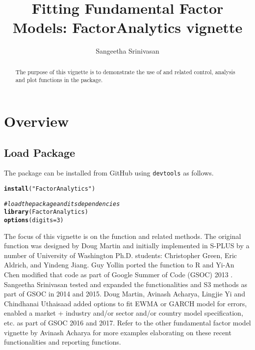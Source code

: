 \documentclass[a4paper]{article}\usepackage[]{graphicx}\usepackage[]{color}
\makeatletter
\newcommand{\hlnum}[1]{\textcolor[rgb]{0.686,0.059,0.569}{#1}}%
\newcommand{\hlstr}[1]{\textcolor[rgb]{0.192,0.494,0.8}{#1}}%
\newcommand{\hlcom}[1]{\textcolor[rgb]{0.678,0.584,0.686}{\textit{#1}}}%
\newcommand{\hlstd}[1]{\textcolor[rgb]{0.345,0.345,0.345}{#1}}%
\newcommand{\hlkwc}[1]{\textcolor[rgb]{0.333,0.667,0.333}{#1}}%
\newcommand{\hlkwd}[1]{\textcolor[rgb]{0.737,0.353,0.396}{\textbf{#1}}}%
\newenvironment{kframe}{%
 \def\at@end@of@kframe{}%
 \ifinner\ifhmode%
  \def\at@end@of@kframe{\end{minipage}}%
  \begin{minipage}{\columnwidth}%
 \fi\fi%
 \def\FrameCommand##1{\hskip\@totalleftmargin \hskip-\fboxsep
 \colorbox{shadecolor}{##1}\hskip-\fboxsep
     \hskip-\linewidth \hskip-\@totalleftmargin \hskip\columnwidth}%
 \MakeFramed {\advance\hsize-\width
   \@totalleftmargin\z@ \linewidth\hsize
   \@setminipage}}%
 {\par\unskip\endMakeFramed%
 \at@end@of@kframe}
\newenvironment{knitrout}{}{} %
\makeatother
\begin{document}
\title{Fitting Fundamental Factor Models: FactorAnalytics vignette}
\author{Sangeetha Srinivasan}
\maketitle

\begin{abstract}
The purpose of this vignette is to demonstrate the use of  and related control, analysis and plot functions in the  package.
\end{abstract}

\tableofcontents
\bigskip

\newpage
\section{Overview}

\subsection{Load Package}


The package can be installed from GitHub using \verb"devtools" as follows.
\begin{knitrout}
\color{fgcolor}\begin{kframe}
\begin{alltt}
\hlkwd{install}\hlstd{(}\hlstr{"FactorAnalytics"}\hlstd{)}
\end{alltt}
\end{kframe}
\end{knitrout}

\begin{knitrout}
\color{fgcolor}\begin{kframe}
\begin{alltt}
\hlcom{# load the package and its dependencies}
\hlkwd{library}\hlstd{(FactorAnalytics)}
\hlkwd{options}\hlstd{(}\hlkwc{digits}\hlstd{=}\hlnum{3}\hlstd{)}
\end{alltt}
\end{kframe}
\end{knitrout}

The focus of this vignette is on the  function and related methods. The original function was designed by Doug Martin and initially implemented in S-PLUS by a number of University of Washington Ph.D. students: Christopher Green, Eric Aldrich, and Yindeng Jiang. Guy Yollin ported the function to R and Yi-An Chen modified that code as part of Google Summer of Code (GSOC) 2013 . Sangeetha Srinivasan tested and expanded the functionalities and S3 methods as part of GSOC in 2014 and 2015. Doug Martin, Avinash Acharya, Lingjie Yi and Chindhanai Uthaisaad added options to fit EWMA or GARCH model for errors, enabled a market + industry and/or sector and/or country model specification, etc. as part of GSOC 2016 and 2017. Refer to the other fundamental factor model vignette by Avinash Acharya for more examples elaborating on these recent functionalities and reporting functions.
\end{document}
